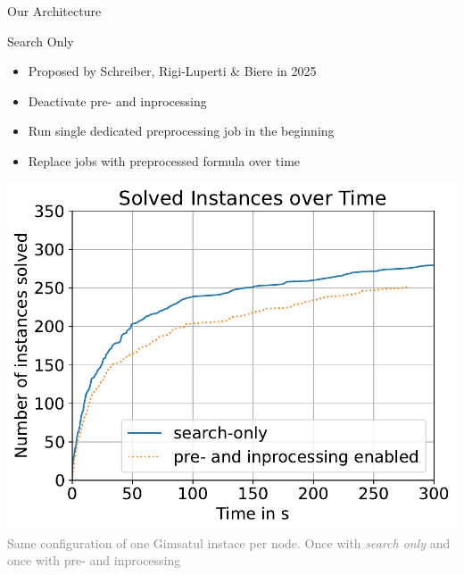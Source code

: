 \documentclass[]{sdqbeamer}
\begin{document}
\begin{frame}{Our Architecture}
    \begin{minipage}{0.45\textwidth}
        \center
        \begin{block}{Search Only}
            \begin{itemize}
                \item Proposed by Schreiber, Rigi-Luperti \& Biere in 2025
                \item Deactivate pre- and inprocessing
                \item Run single dedicated preprocessing job in the beginning
                \item Replace jobs with preprocessed formula over time
            \end{itemize}
        \end{block}
    \end{minipage}%
    \hfill
    \begin{minipage}{0.45\textwidth}
        \center
        \includegraphics[scale=.8]{plots/config_compare/search_only_compare.pdf}\\
        \textcolor{gray}{Same configuration of one Gimsatul instace per node. Once with \textit{search only} and once with pre- and inprocessing}
    \end{minipage}%

\end{frame}

\end{document}
